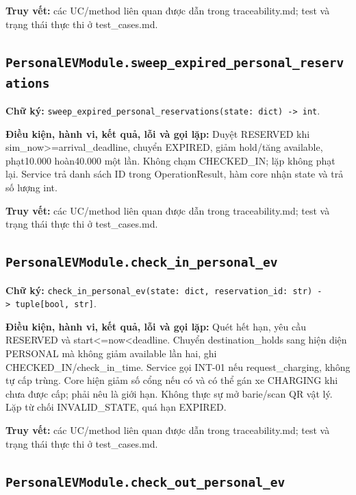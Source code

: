 \documentclass[11pt,a4paper]{article}
\begin{document}
\textbf{Truy vết:} các UC/method liên quan được dẫn trong
traceability.md; test và trạng thái thực thi ở test\_cases.md.

\hypertarget{personalevmodule.sweep_expired_personal_reservations}{%
\subsection{\texorpdfstring{\texttt{PersonalEVModule.sweep\_expired\_personal\_reservations}}{PersonalEVModule.sweep\_expired\_personal\_reservations}}\label{personalevmodule.sweep_expired_personal_reservations}}

\textbf{Chữ ký:}
\texttt{sweep\_expired\_personal\_reservations(state:\ dict)\ -\textgreater{}\ int}.

\textbf{Điều kiện, hành vi, kết quả, lỗi và gọi lặp:} Duyệt RESERVED khi
sim\_now\textgreater=arrival\_deadline, chuyển EXPIRED, giảm hold/tăng
available, phạt10.000 hoàn40.000 một lần. Không chạm CHECKED\_IN; lặp
không phạt lại. Service trả danh sách ID trong OperationResult, hàm core
nhận state và trả số lượng int.

\textbf{Truy vết:} các UC/method liên quan được dẫn trong
traceability.md; test và trạng thái thực thi ở test\_cases.md.

\hypertarget{personalevmodule.check_in_personal_ev}{%
\subsection{\texorpdfstring{\texttt{PersonalEVModule.check\_in\_personal\_ev}}{PersonalEVModule.check\_in\_personal\_ev}}\label{personalevmodule.check_in_personal_ev}}

\textbf{Chữ ký:}
\texttt{check\_in\_personal\_ev(state:\ dict,\ reservation\_id:\ str)\ -\textgreater{}\ tuple{[}bool,\ str{]}}.

\textbf{Điều kiện, hành vi, kết quả, lỗi và gọi lặp:} Quét hết hạn, yêu
cầu RESERVED và start\textless=now\textless deadline. Chuyển
destination\_holds sang hiện diện PERSONAL mà không giảm available lần
hai, ghi CHECKED\_IN/check\_in\_time. Service gọi INT-01 nếu
request\_charging, không tự cấp trùng. Core hiện giảm số cổng nếu có và
có thể gán xe CHARGING khi chưa được cấp; phải nêu là giới hạn. Không
thực sự mở barie/scan QR vật lý. Lặp từ chối INVALID\_STATE, quá hạn
EXPIRED.

\textbf{Truy vết:} các UC/method liên quan được dẫn trong
traceability.md; test và trạng thái thực thi ở test\_cases.md.

\hypertarget{personalevmodule.check_out_personal_ev}{%
\subsection{\texorpdfstring{\texttt{PersonalEVModule.check\_out\_personal\_ev}}{PersonalEVModule.check\_out\_personal\_ev}}\label{personalevmodule.check_out_personal_ev}}
\end{document}
